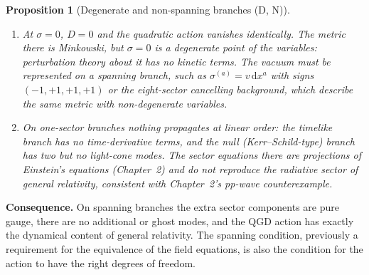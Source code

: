 \documentclass[11pt,a4paper]{article}
\newtheorem{proposition}[theorem]{Proposition}
\begin{document}
\begin{proposition}[Degenerate and non-spanning branches (D, N)]\label{prop:degenerate}
\begin{enumerate}
\item At $\sigma=0$, $D=0$ and the quadratic action vanishes identically. The metric there
is Minkowski, but $\sigma=0$ is a degenerate point of the variables: perturbation theory
about it has no kinetic terms. The vacuum must be represented on a spanning branch, such as
$\sigma^{(a)}=v\,\mathrm dx^a$ with signs $(-1,+1,+1,+1)$ or the eight-sector cancelling background,
which describe the same metric with non-degenerate variables.
\item On one-sector branches nothing propagates at linear order: the timelike branch has no
time-derivative terms, and the null (Kerr--Schild-type) branch has two but no light-cone
modes. The sector equations there are projections of Einstein's equations (Chapter~2) and do
not reproduce the radiative sector of general relativity, consistent with Chapter~2's
pp-wave counterexample.
\end{enumerate}
\end{proposition}
\noindent\textbf{Consequence.} On spanning branches the extra sector components are pure
gauge, there are no additional or ghost modes, and the QGD action has exactly the dynamical
content of general relativity. The spanning condition, previously a requirement for the
equivalence of the field equations, is also the condition for the action to have the right
degrees of freedom.
\end{document}
